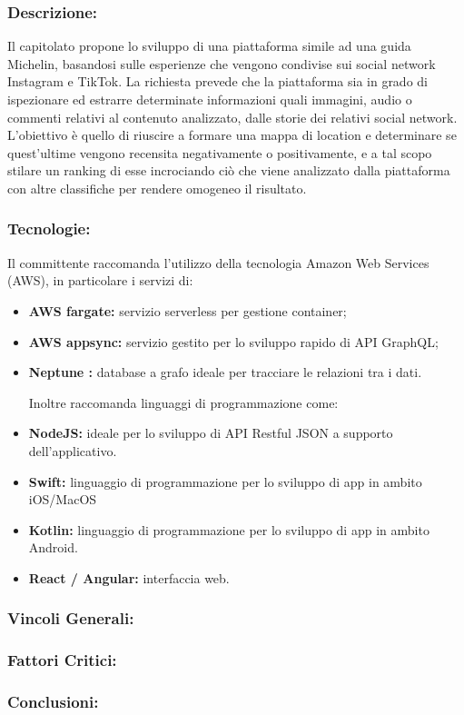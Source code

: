 \subsubsection{Descrizione:}
Il capitolato propone lo sviluppo di una piattaforma simile ad una guida Michelin, basandosi sulle esperienze che vengono condivise sui social network Instagram e TikTok.
La richiesta prevede che la piattaforma sia in grado di ispezionare ed estrarre determinate informazioni quali immagini, audio o commenti relativi al contenuto analizzato, dalle storie dei relativi social network.
L’obiettivo è quello di riuscire a formare una mappa di location e determinare se quest’ultime vengono recensita negativamente o positivamente, e a tal scopo stilare un ranking di esse incrociando ciò che viene analizzato dalla piattaforma con altre classifiche per rendere omogeneo il risultato.
\subsubsection{Tecnologie:}
Il committente raccomanda l’utilizzo della tecnologia Amazon Web Services (AWS), in particolare i servizi di:
\begin{itemize}
	\item \textbf{AWS fargate:} servizio serverless per gestione container;
	\item \textbf{AWS appsync:} servizio gestito per lo sviluppo rapido di API GraphQL;
	\item \textbf{Neptune :} database a grafo ideale per tracciare le relazioni tra i dati.
	
	Inoltre raccomanda linguaggi di programmazione come:
	\item \textbf{NodeJS:} ideale per lo sviluppo di API Restful JSON a supporto dell’applicativo.
	\item \textbf{Swift:} linguaggio di programmazione per lo sviluppo di app in ambito iOS/MacOS
	\item \textbf{Kotlin:} linguaggio di programmazione per lo sviluppo di app in ambito Android.
	\item \textbf{React / Angular:} interfaccia web.
\end{itemize}

\subsubsection{Vincoli Generali:}

\subsubsection{Fattori Critici:}

\subsubsection{Conclusioni:}